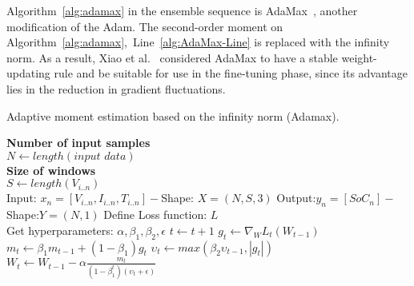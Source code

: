 %
\mbox{Algorithm~\ref{alg:adamax}} in the ensemble sequence is AdaMax~\cite{kingma_adam_2017}, another modification of the Adam.
The second-order moment on \mbox{Algorithm~\ref{alg:adamax}, Line~\ref{alg:AdaMax-Line}} is replaced with the infinity norm.
As a result, Xiao et al.~\cite{xiao_accurate_2019} considered AdaMax to have a stable weight-updating rule and be suitable for use in the fine-tuning phase, since its advantage lies in the reduction in gradient fluctuations.
\begin{algorithm}[H]%
  \caption{Adaptive moment estimation based on the infinity norm (Adamax).}
  \begin{algorithmic}[1]
    \STATE \textbf{Number of input samples} \\ $N\gets length(\textit{input data})$\\
    \STATE \textbf{Size of windows} \\ $S\gets length(V_{i..n})$\\
    \STATE Input: $x_n = [V_{i..n}, I_{i..n}, T_{i..n}] - $Shape: $X = (N, S, 3)$
    \STATE Output:$y_n = [SoC_{n}] - $Shape:$Y = (N, 1)$
    \STATE Define Loss function: $L$ \\
    Get hyperparameters: $\alpha, \beta_1, \beta_2, \epsilon$
      \STATE $t \gets t+1$
      \STATE $g_t \gets \nabla_W L_t (W_{t-1})$ 
      \STATE $m_t \gets \beta_1 m_{t-1}+(1-\beta_1) g_t $ 
      \STATE $\upsilon_t \gets max\left(\beta_2\upsilon_{t-1}, |g_t|\right) $ 
      \STATE $W_t \gets W_{t-1}- \alpha \frac{m_t}{(1-\beta^t_1)(\upsilon_t+\epsilon)} $ 
    \ENDWHILE
  \end{algorithmic}
  \label{alg:adamax}
\end{algorithm}

